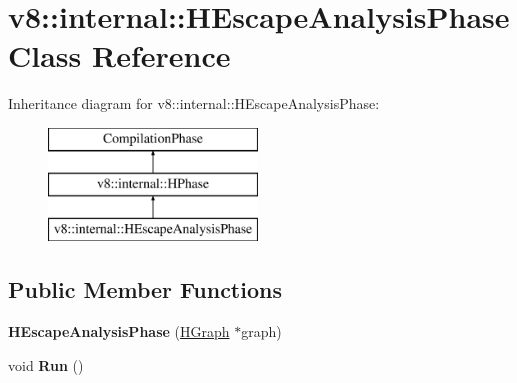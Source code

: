 \hypertarget{classv8_1_1internal_1_1_h_escape_analysis_phase}{}\section{v8\+:\+:internal\+:\+:H\+Escape\+Analysis\+Phase Class Reference}
\label{classv8_1_1internal_1_1_h_escape_analysis_phase}
Inheritance diagram for v8\+:\+:internal\+:\+:H\+Escape\+Analysis\+Phase\+:\begin{figure}[H]
\begin{center}
\leavevmode
\includegraphics[height=3.000000cm]{classv8_1_1internal_1_1_h_escape_analysis_phase}
\end{center}
\end{figure}
\subsection*{Public Member Functions}
\begin{DoxyCompactItemize}
\item 
{\bfseries H\+Escape\+Analysis\+Phase} (\hyperlink{classv8_1_1internal_1_1_h_graph}{H\+Graph} $\ast$graph)\hypertarget{classv8_1_1internal_1_1_h_escape_analysis_phase_ac66c85fedf2119f66dc528b466435938}{}\label{classv8_1_1internal_1_1_h_escape_analysis_phase_ac66c85fedf2119f66dc528b466435938}

\item 
void {\bfseries Run} ()\hypertarget{classv8_1_1internal_1_1_h_escape_analysis_phase_a2f88b7156ec353b5590d1bc189f22061}{}\label{classv8_1_1internal_1_1_h_escape_analysis_phase_a2f88b7156ec353b5590d1bc189f22061}

\end{DoxyCompactItemize}
